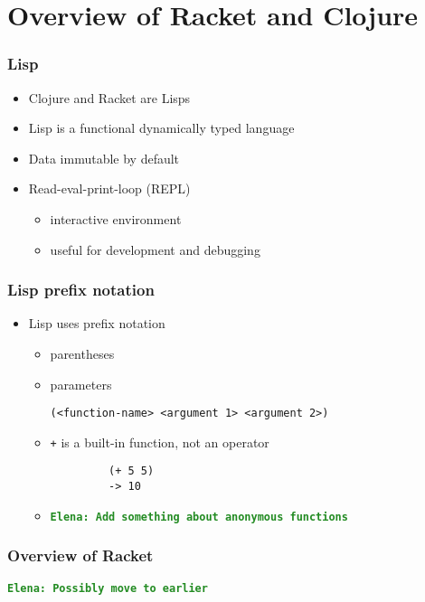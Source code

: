 \documentclass{beamer}
\newcommand{\comment}[1]{{\bf \tt  {#1}}}
\newcommand{\emcomment}[1]{\textcolor{ForestGreen}{\comment{Elena: {#1}}}}
\begin{document}
\section{Overview of Racket and Clojure}

\begin{frame}
\frametitle{Lisp}
	\begin{itemize}
		\item Clojure and Racket are Lisps
		\item Lisp is a functional dynamically typed language
		\item Data immutable by default
  			\item Read-eval-print-loop (REPL)
  	 		\begin{itemize}
  	 		\item interactive environment
  	 		\item useful for development and debugging
  	 	\end{itemize}
	\end{itemize}
\end{frame}

\begin{frame}[fragile]
\frametitle{Lisp prefix notation}
	\begin{itemize}
  	  \item Lisp uses prefix notation
  	  \begin{itemize}
  	 	 \item parentheses
  	 	 \item parameters
  	 	 
  	 	 \texttt{(<function-name> <argument 1> <argument 2>)}
  	 	 \item \texttt{+} is a built-in function, not an operator
  	 	 \begin{verbatim}		
		 (+ 5 5)
		 -> 10
	     \end{verbatim}
		\item \emcomment{Add something about anonymous functions}
	  \end{itemize}
   \end{itemize}
\end{frame}

\begin{frame}
\frametitle{Overview of Racket}
\emcomment{Possibly move to earlier}
\end{frame}
\end{document}
